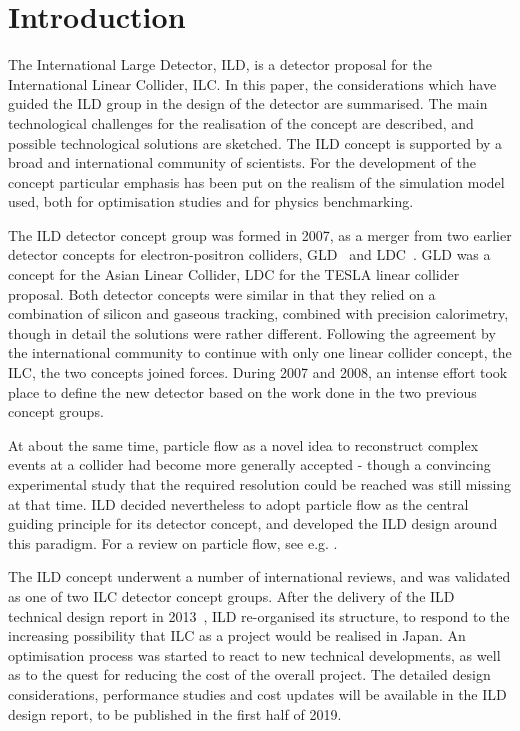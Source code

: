 \documentclass[%
 amsmath,amssymb,
 aps,
]{revtex4-1}
\begin{document}
\maketitle


\section{\label{sec:level1}Introduction}
The International Large Detector, ILD, is a detector proposal for the International Linear Collider, ILC. In this paper, the considerations which have guided the ILD group in the design of the detector are summarised. The main technological challenges for the realisation of the concept are described, and possible technological solutions are sketched. The ILD concept is supported by a broad and international community of scientists. For the development of the concept particular emphasis has been put on the realism of the simulation model used, both for optimisation studies and for physics benchmarking.

The ILD detector concept group was formed in 2007, as a merger from two earlier detector concepts for electron-positron colliders, GLD~\cite{ild:bib:ref-gld} and LDC~\cite{ild:bib:ref-ldc}. GLD was a concept for the Asian Linear Collider, LDC for the TESLA linear collider proposal. Both detector concepts were similar in that they relied on a combination of silicon and gaseous tracking, combined with precision calorimetry, though in detail the solutions were rather different. Following the agreement by the international community to continue with only one linear collider concept, the ILC, the two concepts joined forces. During 2007 and 2008, an intense effort took place to define the new detector based on the work done in the two previous concept groups. 

At about the same time, particle flow as a novel idea to reconstruct complex events at a collider had become more generally accepted - though a convincing experimental study that the required resolution could be reached was still missing at that time. ILD decided nevertheless to adopt particle flow as the central guiding principle for its detector concept, and developed the ILD design around this paradigm. For a review on particle flow, see e.g. \cite{ild:bib:PandoraPFA}.

The ILD concept underwent a number of international reviews, and was validated as one of two ILC detector concept groups. After the delivery of the ILD technical design report in 2013~\cite{Behnke:2013lya}, ILD re-organised its structure, to respond to the increasing possibility that ILC as a project would be realised in Japan. An optimisation process was started to react to new technical developments, as well as to the quest for reducing the cost of the overall project. The detailed design considerations, performance studies and cost updates will be available in the ILD design report, to be published in the first half of 2019. 
\end{document}
